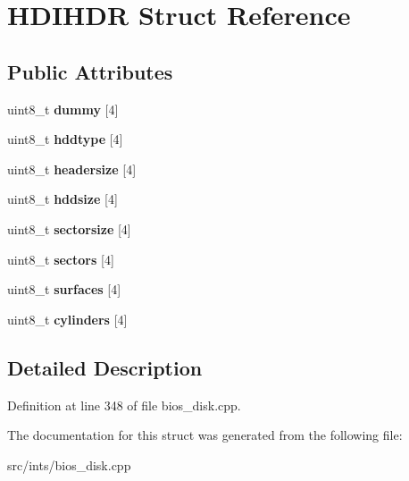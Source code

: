 \hypertarget{structHDIHDR}{\section{H\-D\-I\-H\-D\-R Struct Reference}
\label{structHDIHDR}
}
\subsection*{Public Attributes}
\begin{DoxyCompactItemize}
\item 
\hypertarget{structHDIHDR_ae41c262463f3201e383a1c9390ae901c}{uint8\-\_\-t {\bfseries dummy} \mbox{[}4\mbox{]}}\label{structHDIHDR_ae41c262463f3201e383a1c9390ae901c}

\item 
\hypertarget{structHDIHDR_ab51b532bb68c10726d57f635bb77dc4d}{uint8\-\_\-t {\bfseries hddtype} \mbox{[}4\mbox{]}}\label{structHDIHDR_ab51b532bb68c10726d57f635bb77dc4d}

\item 
\hypertarget{structHDIHDR_ab03e0699debea645f1ba0571ddedf82a}{uint8\-\_\-t {\bfseries headersize} \mbox{[}4\mbox{]}}\label{structHDIHDR_ab03e0699debea645f1ba0571ddedf82a}

\item 
\hypertarget{structHDIHDR_a552e396437dfc751af75133fc9abd875}{uint8\-\_\-t {\bfseries hddsize} \mbox{[}4\mbox{]}}\label{structHDIHDR_a552e396437dfc751af75133fc9abd875}

\item 
\hypertarget{structHDIHDR_a2dc5f3e10810fa24566f03f8b26dab4f}{uint8\-\_\-t {\bfseries sectorsize} \mbox{[}4\mbox{]}}\label{structHDIHDR_a2dc5f3e10810fa24566f03f8b26dab4f}

\item 
\hypertarget{structHDIHDR_aa8388e85e4ef3007467293eea28e0082}{uint8\-\_\-t {\bfseries sectors} \mbox{[}4\mbox{]}}\label{structHDIHDR_aa8388e85e4ef3007467293eea28e0082}

\item 
\hypertarget{structHDIHDR_a74ee482205337db4273020bef91f3056}{uint8\-\_\-t {\bfseries surfaces} \mbox{[}4\mbox{]}}\label{structHDIHDR_a74ee482205337db4273020bef91f3056}

\item 
\hypertarget{structHDIHDR_a61459f45085bcacd0325cc64862fc396}{uint8\-\_\-t {\bfseries cylinders} \mbox{[}4\mbox{]}}\label{structHDIHDR_a61459f45085bcacd0325cc64862fc396}

\end{DoxyCompactItemize}


\subsection{Detailed Description}


Definition at line 348 of file bios\-\_\-disk.\-cpp.



The documentation for this struct was generated from the following file\-:\begin{DoxyCompactItemize}
\item 
src/ints/bios\-\_\-disk.\-cpp\end{DoxyCompactItemize}
